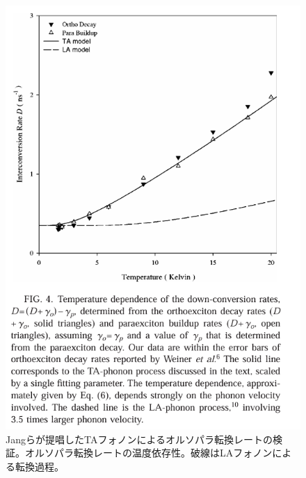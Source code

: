 \begin{figure}[htbp]
\begin{center}
\begin{minipage}[b]{0.45\textwidth}
\centering
\includegraphics[width=\textwidth]{Scrennshoot_2024-07-22_175154.png}
\caption{Jangらが提唱したTAフォノンによるオルソパラ転換レートの検証。オルソパラ転換レートの温度依存性。破線はLAフォノンによる転換過程。}
\end{minipage}
\hspace{0.05\textwidth} %
\begin{minipage}[b]{0.45\textwidth}
\centering

\end{minipage}
\end{center}
\end{figure}
